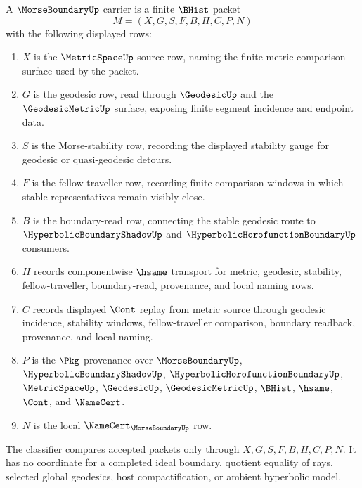 \begin{definition}
\label{def:morse-boundary-carrier}
A $\MorseBoundaryUp$ carrier is a finite $\BHist$ packet
$$
M=(X,G,S,F,B,H,C,P,N)
$$
with the following displayed rows:
\begin{enumerate}
\item $X$ is the $\MetricSpaceUp$ source row, naming the finite metric comparison surface used by the packet.
\item $G$ is the geodesic row, read through $\GeodesicUp$ and the $\GeodesicMetricUp$ surface, exposing finite segment incidence and endpoint data.
\item $S$ is the Morse-stability row, recording the displayed stability gauge for geodesic or quasi-geodesic detours.
\item $F$ is the fellow-traveller row, recording finite comparison windows in which stable representatives remain visibly close.
\item $B$ is the boundary-read row, connecting the stable geodesic route to $\HyperbolicBoundaryShadowUp$ and $\HyperbolicHorofunctionBoundaryUp$ consumers.
\item $H$ records componentwise $\hsame$ transport for metric, geodesic, stability, fellow-traveller, boundary-read, provenance, and local naming rows.
\item $C$ records displayed $\Cont$ replay from metric source through geodesic incidence, stability windows, fellow-traveller comparison, boundary readback, provenance, and local naming.
\item $P$ is the $\Pkg$ provenance over $\MorseBoundaryUp$, $\HyperbolicBoundaryShadowUp$, $\HyperbolicHorofunctionBoundaryUp$, $\MetricSpaceUp$, $\GeodesicUp$, $\GeodesicMetricUp$, $\BHist$, $\hsame$, $\Cont$, and $\NameCert$.
\item $N$ is the local $\NameCert_{\MorseBoundaryUp}$ row.
\end{enumerate}
The classifier compares accepted packets only through $X,G,S,F,B,H,C,P,N$. It has no coordinate for a completed ideal boundary, quotient equality of rays, selected global geodesics, host compactification, or ambient hyperbolic model.
\end{definition}

